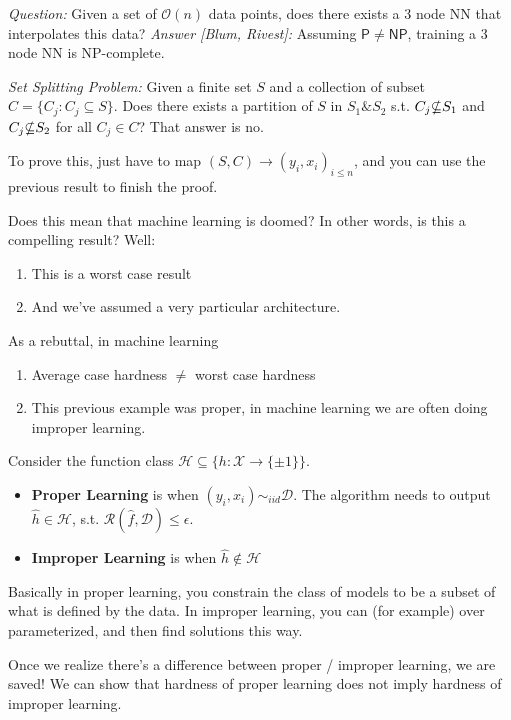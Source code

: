 \emph{Question:} Given a set of $\mathcal O(n)$ data points, does there exists a 3 node NN  that interpolates this data? \emph{Answer [Blum, Rivest]:} Assuming $\mathsf P \neq \mathsf{NP}$, training a 3 node NN is NP-complete.

\begin{sidework}
\emph{Set Splitting Problem:}
	Given a finite set $S$ and a collection of subset $ C = \{C_j : C_j \subseteq S\}$. Does there exists a partition of $S$ in $S_1 \& S_2$ s.t. $C_j \slashed \subseteq S_1$ and $C_j \slashed \subseteq S_2$ for all $C_j \in C$? That answer is no.

To prove this, just have to map $(S, C) \to (y_i, x_i)_{i\leq n}$, and you can use the previous result to finish the proof.
\end{sidework}
Does this mean that machine learning is doomed? In other words, is this a compelling result? Well:
\begin{enumerate}
	\item This is a worst case result
	\item And we've assumed a very particular architecture.
\end{enumerate}
As a rebuttal, in machine learning
\begin{enumerate}
	\item Average case hardness $\neq$ worst case hardness
	\item This previous example was proper, in machine learning we are often doing improper learning.
\end{enumerate}
\begin{definition}
	 Consider the function class $\mathcal H \subseteq \{h : \mathcal X \to \{\pm 1\}\}$.
	\begin{itemize}
		\item \textbf{Proper Learning} is when $(y_i, x_i) \sim_{iid} \mathcal D$. The algorithm needs to output $\hat h \in \mathcal H$, s.t. $\mathcal R(\hat f , \mathcal D) \leq \epsilon$.
		\item \textbf{Improper Learning} is when $\hat h \notin \mathcal H$ 
	\end{itemize}
	Basically in proper learning, you constrain the class of models to be a subset of what is defined by the data. In improper learning, you can (for example) over parameterized, and then find solutions this way.
\end{definition}
Once we realize there's a difference between proper / improper learning, we are saved! We can show that hardness of proper learning does not imply hardness of improper learning.

